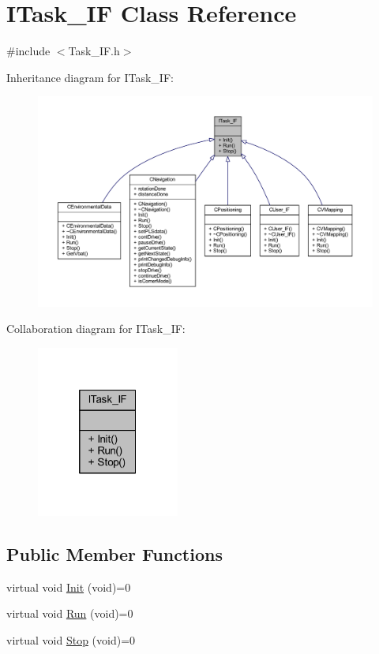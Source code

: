 \hypertarget{class_i_task___i_f}{}\section{I\+Task\+\_\+\+IF Class Reference}
\label{class_i_task___i_f}


{\ttfamily \#include $<$Task\+\_\+\+I\+F.\+h$>$}



Inheritance diagram for I\+Task\+\_\+\+IF\+:
\nopagebreak
\begin{figure}[H]
\begin{center}
\leavevmode
\includegraphics[width=350pt]{class_i_task___i_f__inherit__graph}
\end{center}
\end{figure}


Collaboration diagram for I\+Task\+\_\+\+IF\+:\nopagebreak
\begin{figure}[H]
\begin{center}
\leavevmode
\includegraphics[width=133pt]{class_i_task___i_f__coll__graph}
\end{center}
\end{figure}
\subsection*{Public Member Functions}
\begin{DoxyCompactItemize}
\item 
virtual void \mbox{\hyperlink{class_i_task___i_f_a28f608bdb9b19658403f7b9b7421968d}{Init}} (void)=0
\item 
virtual void \mbox{\hyperlink{class_i_task___i_f_ab73cc5879a61d00fc59b72cce32cc6f7}{Run}} (void)=0
\item 
virtual void \mbox{\hyperlink{class_i_task___i_f_af5f8fba86704c7e36d0e4681d58300c6}{Stop}} (void)=0
\end{DoxyCompactItemize}


